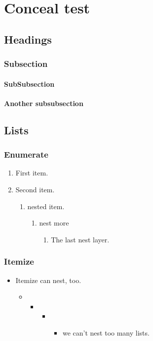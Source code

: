 \documentclass{ctexbook}
\begin{document}
\chapter{Conceal test}
\section{Headings}
\subsection{Subsection}
\subsubsection{SubSubsection}
\subsubsection{Another subsubsection}
\section{Lists}
\subsection{Enumerate}
\begin{enumerate}
  \item First item.
  \item Second item.
    \begin{enumerate}
      \item nested item.
        \begin{enumerate}
          \item nest more
            \begin{enumerate}
              \item The last nest layer.
            \end{enumerate}
        \end{enumerate}
    \end{enumerate}
\end{enumerate}
\subsection{Itemize}
\begin{itemize}
  \item Itemize can nest, too.
    \begin{itemize}
      \item
        \begin{itemize}
          \item
            \begin{itemize}
              \item
                \begin{itemize}
                  \item we can't nest too many lists.
                \end{itemize}
            \end{itemize}
        \end{itemize}
    \end{itemize}
\end{itemize}
\end{document}
